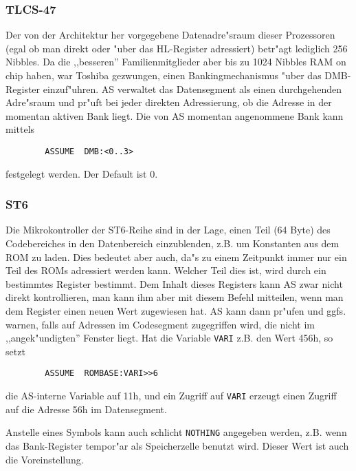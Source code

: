 \documentclass[12pt,a4paper,twoside]{report}
\newcommand{\tty}[1]{{\tt #1}}
\begin{document}
\subsubsection{TLCS-47}

Der von der Architektur her vorgegebene Datenadre"sraum dieser
Prozessoren (egal ob man direkt oder "uber das HL-Register adressiert)
betr"agt lediglich 256 Nibbles.  Da die ,,besseren'' Familienmitglieder
aber bis zu 1024 Nibbles RAM on chip haben, war Toshiba gezwungen, einen
Bankingmechanismus "uber das DMB-Register einzuf"uhren.  AS verwaltet
das Datensegment als einen durchgehenden Adre"sraum und pr"uft bei jeder
direkten Adressierung, ob die Adresse in der momentan aktiven Bank
liegt.  Die von AS momentan angenommene Bank kann mittels
\begin{verbatim}
        ASSUME  DMB:<0..3>
\end{verbatim}
festgelegt werden.  Der Default ist 0.


\subsubsection{ST6}
\label{ST6Assume}

Die Mikrokontroller der ST6-Reihe sind in der Lage, einen Teil (64 Byte)
des Codebereiches in den Datenbereich einzublenden, z.B. um Konstanten aus
dem ROM zu laden.  Dies bedeutet aber auch, da"s zu einem Zeitpunkt immer
nur ein Teil des ROMs adressiert werden kann.  Welcher Teil dies ist, wird
durch ein bestimmtes Register bestimmt.  Dem Inhalt dieses Registers kann
AS zwar nicht direkt kontrollieren, man kann ihm aber mit diesem Befehl
mitteilen, wenn man dem Register einen neuen Wert zugewiesen hat.  AS kann
dann pr"ufen und ggfs. warnen, falls auf Adressen im Codesegment
zugegriffen wird, die nicht im ,,angek"undigten'' Fenster liegt.
Hat die Variable \tty{VARI} z.B. den Wert 456h, so setzt
\begin{verbatim}
        ASSUME  ROMBASE:VARI>>6
\end{verbatim}
die AS-interne Variable auf 11h, und ein Zugriff auf \tty{VARI} erzeugt einen
Zugriff auf die Adresse 56h im Datensegment.

Anstelle eines Symbols kann auch schlicht \tty{NOTHING} angegeben
werden, z.B. wenn das Bank-Register tempor"ar als Speicherzelle benutzt
wird.  Dieser Wert ist auch die Voreinstellung.
\end{document}
